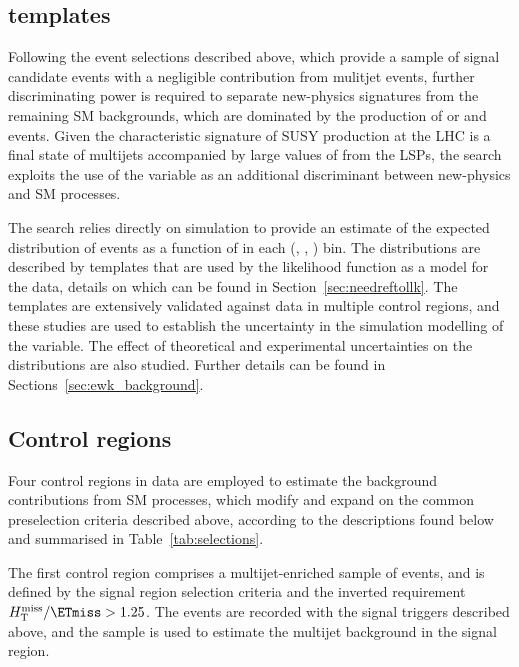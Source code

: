 \subsection{\HTmiss templates}
\label{sec:mht_templates} 

Following the event selections described above, which provide a sample
of signal candidate events with a negligible contribution from
mulitjet events, further discriminating power is required to separate
new-physics signatures from the remaining SM backgrounds, which are
dominated by the production of \ttbar or \wlj and \znunuj
events. Given the characteristic signature of SUSY production at the
LHC is a final state of multijets accompanied by large values of
\ptvecmiss from the LSPs, the search exploits the use of the \HTmiss
variable as an additional discriminant between new-physics and SM
processes.

The search relies directly on simulation to provide an estimate of the
expected distribution of events as a function of \HTmiss in each
(\njet, \nb, \scalht) bin. The distributions are described by
templates that are used by the likelihood function as a model for the
data, details on which can be found in
Section~\ref{sec:needreftollk}. The templates are extensively
validated against data in multiple control regions, and these studies
are used to establish the uncertainty in the simulation modelling of
the \HTmiss variable. The effect of theoretical and experimental
uncertainties on the \HTmiss distributions are also studied. Further
details can be found in Sections~\ref{sec:ewk_background}.


\subsection{Control regions}
\label{sec:control_regions}

Four control regions in data are employed to estimate the background
contributions from SM processes, which modify and expand on the
common preselection criteria described above, according to the
descriptions found below and summarised in Table~\ref{tab:selections}.

The first control region comprises a multijet-enriched sample of
events, and is defined by the signal region selection criteria and the
inverted requirement $\HTmiss / \ETmiss > 1.25$. The events are
recorded with the signal triggers described above, and the sample is
used to estimate the multijet background in the signal region.
 
